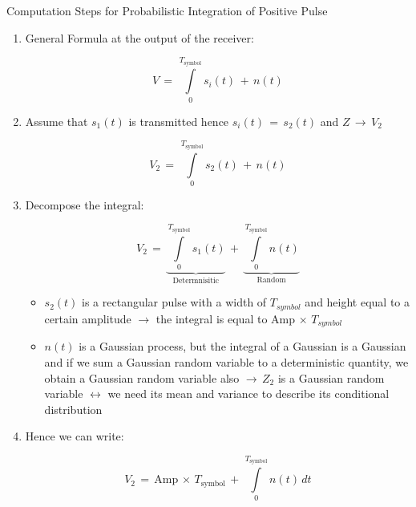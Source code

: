 \documentclass{Beamer}
\begin{document}
\begin{frame}[t,allowframebreaks]{Computation Steps for Probabilistic Integration of Positive Pulse}

\begin{enumerate}

\item General Formula at the output of the receiver:

\begin{equation}
V \, = \, \displaystyle\int\limits_{0}^{T_{\text{symbol}}} s_i(t) \, + \, n(t)
\end{equation}

\item Assume that $s_1(t)$ is transmitted hence $s_i(t) \, = \, s_2(t)$ and $Z\, \rightarrow \, V_2$

\begin{equation}
V_2 \, = \, \displaystyle\int\limits_{0}^{T_{\text{symbol}}} s_2(t) \, + \, n(t)
\end{equation}

\item Decompose the integral:

\begin{equation}
V_2 \, = \, \underbrace{\displaystyle\int\limits_{0}^{T_{\text{symbol}}} s_1(t)}_{\text{Determnisitic}}  \, + \,   \underbrace{\displaystyle\int\limits_{0}^{T_{\text{symbol}}}n(t)}_{\text{Random}}
\end{equation}

	\begin{itemize}
	\item $s_2(t)$ is a rectangular pulse with a width of $ T_{symbol}$ and height equal to a certain amplitude $\rightarrow$ the integral is equal to $ \text{Amp}\, \times \, T_{symbol}$
	
	\item $n(t)$ is a Gaussian process, but the integral of a Gaussian is a Gaussian and if we sum a Gaussian random variable to a deterministic quantity, we obtain a Gaussian random variable also $\rightarrow \, Z_2$ is a Gaussian random variable $\leftrightarrow$ we need its mean and variance to describe its conditional distribution
	\end{itemize}


\item  Hence we can write:

\begin{equation}
V_2 \, = \,  \text{Amp}\, \times \, T_{\text{symbol}} \, + \,   \displaystyle\int\limits_{0}^{T_{\text{symbol}}}n(t)  \, dt
\end{equation}


\end{enumerate}
\end{frame}
\end{document}
